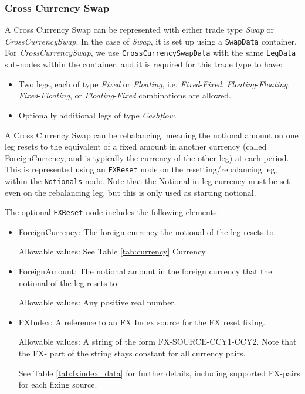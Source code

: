 \subsubsection{Cross Currency Swap}
\label{ss:cross_currency_swap}

A Cross Currency Swap can be represented with either trade type \emph{Swap} or \emph{CrossCurrencySwap}. In the case of \emph{Swap}, it is set up using a {\tt SwapData} container. For \emph{CrossCurrencySwap}, we use {\tt CrossCurrencySwapData} with the same {\tt LegData} sub-nodes within the container, and it is required for this trade type to have: 
\begin{itemize}
 \item Two legs, each of type \emph{Fixed} or \emph{Floating}, i.e. \emph{Fixed}-\emph{Fixed}, \emph{Floating}-\emph{Floating}, \emph{Fixed}-\emph{Floating}, or \emph{Floating}-\emph{Fixed} combinations are allowed. 
\item  Optionally additional legs of type \emph{Cashflow}.
\end{itemize}


A Cross Currency Swap can be rebalancing, meaning the notional amount on one leg resets to the equivalent of a fixed amount in another currency (called ForeignCurrency, and is typically the currency of the other leg) at each period. This is represented using an \lstinline!FXReset! node on the resetting/rebalancing leg, within the \lstinline!Notionals! node. Note that the Notional in leg currency must be set even on the rebalancing leg, but this is only used as starting notional.

The optional \lstinline!FXReset! node includes the following elements:

\begin{itemize}

\item ForeignCurrency: The foreign currency the notional of the leg resets to.  

Allowable values:  See Table \ref{tab:currency} Currency.

\item ForeignAmount: The notional amount in the foreign currency that the notional of the leg resets to.  

Allowable values:  Any positive real number.

\item FXIndex: A reference to an FX Index source for the FX reset fixing. 

Allowable values:  A string of the form FX-SOURCE-CCY1-CCY2. Note that the FX- part of the string stays constant for all currency pairs.

See Table \ref{tab:fxindex_data} for further details, including supported FX-pairs for each fixing source.

\end{itemize}

